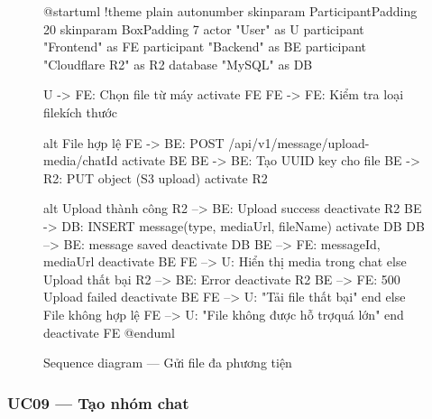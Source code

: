 \documentclass[12pt,a4paper]{report}
\begin{document}
\begin{figure}[H]
    \centering
    \begin{plantuml}
        @startuml
        !theme plain
        autonumber
        skinparam ParticipantPadding 20
        skinparam BoxPadding 7
        actor "User" as U
        participant "Frontend" as FE
        participant "Backend" as BE
        participant "Cloudflare R2" as R2
        database "MySQL" as DB

        U -> FE: Chọn file từ máy
        activate FE
        FE -> FE: Kiểm tra loại file kích thước

        alt File hợp lệ
          FE -> BE: POST /api/v1/message/upload-media/{chatId}
          activate BE
          BE -> BE: Tạo UUID key cho file
          BE -> R2: PUT object (S3 upload)
          activate R2

          alt Upload thành công
            R2 --> BE: Upload success
            deactivate R2
            BE -> DB: INSERT message\n(type, mediaUrl, fileName)
            activate DB
            DB --> BE: message saved
            deactivate DB
            BE --> FE: { messageId, mediaUrl }
            deactivate BE
            FE --> U: Hiển thị media trong chat
          else Upload thất bại
            R2 --> BE: Error
            deactivate R2
            BE --> FE: 500 Upload failed
            deactivate BE
            FE --> U: "Tải file thất bại"
          end
        else File không hợp lệ
          FE --> U: "File không được hỗ trợ quá lớn"
        end
        deactivate FE
        @enduml
    \end{plantuml}
    \caption{Sequence diagram --- Gửi file đa phương tiện}
\end{figure}

\subsubsection{UC09 --- Tạo nhóm chat}
\end{document}
